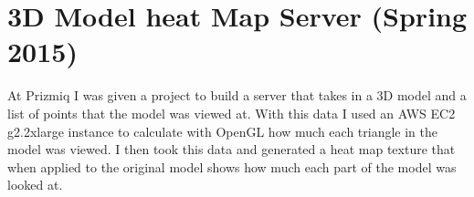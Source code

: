 
\section{3D Model heat Map Server (Spring 2015)}

At Prizmiq I was given a project to build a server that takes in
a 3D model and a list of points that the model was viewed at.
With this data I used an AWS EC2 g2.2xlarge instance to calculate with
OpenGL how much each triangle in the model was viewed.
I then took this data and generated a heat map texture that when applied to the
original model shows how much each part of the model was looked at.


